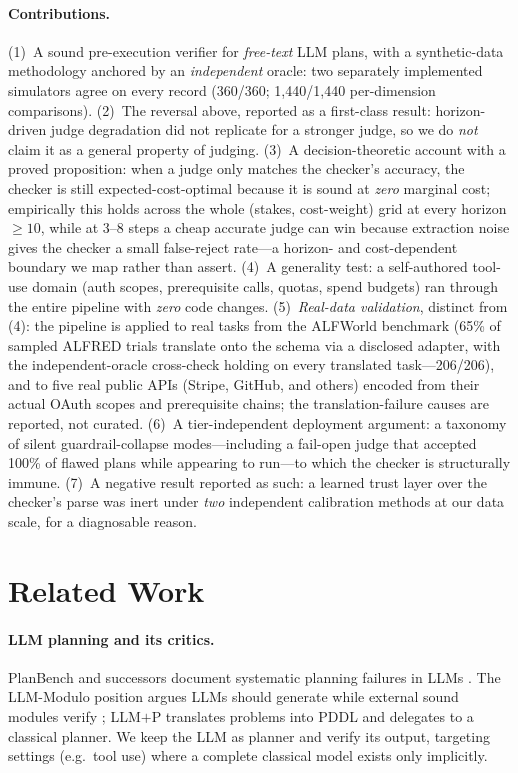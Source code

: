 \documentclass[letterpaper]{article}
\begin{document}
\paragraph{Contributions.}
(1)~A sound pre-execution verifier for \emph{free-text} LLM plans, with a
synthetic-data methodology anchored by an \emph{independent} oracle: two
separately implemented simulators agree on every record (360/360;
1{,}440/1{,}440 per-dimension comparisons). (2)~The reversal above, reported
as a first-class result: horizon-driven judge degradation did not replicate
for a stronger judge, so we do \emph{not} claim it as a general property of
judging. (3)~A decision-theoretic account with a proved proposition: when a
judge only matches the checker's accuracy, the checker is still
expected-cost-optimal because it is sound at \emph{zero} marginal cost;
empirically this holds across the whole (stakes, cost-weight) grid at every
horizon $\ge 10$, while at 3--8 steps a cheap accurate judge can win because
extraction noise gives the checker a small false-reject rate---a horizon-
and cost-dependent boundary we map rather than assert. (4)~A generality
test: a self-authored tool-use domain (auth scopes, prerequisite calls,
quotas, spend budgets) ran through the entire pipeline with \emph{zero} code
changes. (5)~\emph{Real-data validation}, distinct from (4): the pipeline is
applied to real tasks from the ALFWorld benchmark (65\% of sampled ALFRED
trials translate onto the schema via a disclosed adapter, with the
independent-oracle cross-check holding on every translated task---206/206),
and to five real public APIs (Stripe, GitHub, and others) encoded from their
actual OAuth scopes and prerequisite chains; the translation-failure causes
are reported, not curated. (6)~A tier-independent deployment argument: a
taxonomy of silent guardrail-collapse modes---including a fail-open judge
that accepted 100\% of flawed plans while appearing to run---to which the
checker is structurally immune. (7)~A negative result reported as such: a
learned trust layer over the checker's parse was inert under \emph{two}
independent calibration methods at our data scale, for a diagnosable reason.

\section{Related Work}

\paragraph{LLM planning and its critics.}
PlanBench and successors document systematic planning failures in LLMs
\citep{valmeekam2023planbench}. The LLM-Modulo position argues LLMs should
generate while external sound modules verify \citep{kambhampati2024llmmodulo};
LLM$+$P \citep{liu2023llmp} translates problems into PDDL and delegates to a
classical planner. We keep the LLM as planner and verify its output,
targeting settings (e.g.\ tool use) where a complete classical model exists
only implicitly.
\end{document}
